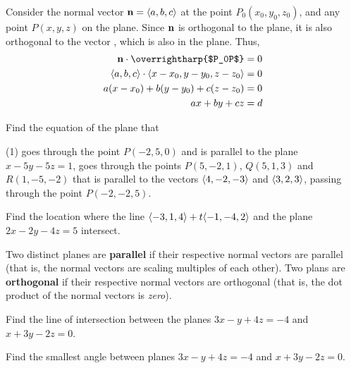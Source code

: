 \documentclass[mathNotesPreamble]{subfiles}
\begin{document}
  Consider the normal vector ${\mathbf{n}}={\left\langle a,b,c \right\rangle}$ at the point $P_0(x_0,y_0,z_0)$, and any point $P(x,y,z)$ on the plane. Since ${\mathbf{n}}$ is orthogonal to the plane, it is also orthogonal to the vector , which is also in the plane. Thus,
    \begin{align*}
      \vecn\cdot\textnormal{\overrightharp{$P_0P$}}&=0\\
      \bracket{a,b,c}\cdot\bracket{x-x_0,y-y_0,z-z_0}&=0\\
      a(x-x_0)+b(y-y_0)+c(z-z_0)&=0\\
      ax+by+cz&=d
    \end{align*}

  \noindent
  \pagebreak
  \begin{ex*}
    Find the equation of the plane that
    \begin{tasks}[after-item-skip=\stretch{1}, label=\textbullet](1)
      \task goes through the point $P(-2,5,0)$ and is parallel to the plane $x-5y-5z=1$,
      \task goes through the points $P(5,-2,1)$, $Q(5,1,3)$ and $R(1,-5,-2)$
      \task that is parallel to the vectors ${\left\langle 4,-2,-3 \right\rangle}$ and ${\left\langle 3,2,3 \right\rangle}$, passing through the point $P(-2,-2,5)$.
    \end{tasks}
  \end{ex*}
  \pagebreak

  \begin{ex*}
    Find the location where the line ${\left\langle -3,1,4 \right\rangle}+t{\left\langle -1,-4,2 \right\rangle}$ and the plane $2x-2y-4z=5$ intersect.
  \end{ex*}

  \begin{defn*}
    Two distinct planes are \textbf{parallel} if their respective normal vectors are parallel (that is, the normal vectors are scaling multiples of each other). Two plans are \textbf{orthogonal} if their respective normal vectors are orthogonal (that is, the dot product of the normal vectors is \textit{zero}).
  \end{defn*}
  \begin{ex*}
    Find the line of intersection between the planes $3x-y+4z=-4$ and $x+3y-2z=0$.
  \end{ex*}
  \pagebreak

  \begin{ex*}
    Find the smallest angle between planes $3x-y+4z=-4$ and $x+3y-2z=0$.
  \end{ex*}

  \pagebreak
  
\end{document}
